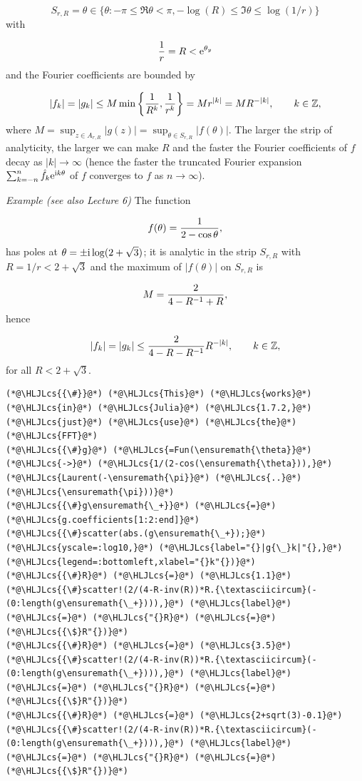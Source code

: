 \documentclass[12pt,a4paper]{article}
\newcommand{\HLJLcs}[1]{\textcolor[RGB]{153,153,119}{\textit{#1}}}
\begin{document}
\[
S_{r,R} = \theta \in    \lbrace \theta : -\pi \leq \Re  \theta < \pi,  -\log(R) \leq \Im \theta \leq \log(1/r) \rbrace
\]
with

\[
{1 \over r} = R < {\rm e}^{\theta_y}
\]
and the Fourier coefficients are bounded by

\[
|f_k | = |g_k |  \leq M\min\left\{{1 \over R^k} , {1 \over r^k}\right\} = M r^{|k|} = M R^{-|k|}, \qquad k \in \mathbb{Z},
\]
where $M = \sup_{z \in  A_{r,R}} |g(z)| = \sup_{\theta \in  S_{r,R}} |f(\theta)|$. The larger the strip of analyticity, the larger we can make $R$ and the faster the Fourier coefficients of $f$ decay as $\vert k \vert \to \infty$ (hence the faster the truncated Fourier expansion $\sum_{k=-n}^{n}\hat f_k {\rm e}^{{\rm i} k \theta}$ of $f$ converges to $f$ as $n \to \infty$).

\emph{Example (see also Lecture 6)} The function

\[
 f(\theta) = {1 \over 2 - \cos\theta},
\]
has poles at $\theta = \pm {\rm i} \log (2 + \sqrt{3})$; it is analytic in the strip $S_{r,R}$ with $R = 1/r < 2 + \sqrt{3}$ and the maximum of $\vert f(\theta) \vert$ on $S_{r,R}$ is

\[
M = {2 \over 4 - R^{-1} + R},
\]
hence

\[
|f_k| =     |g_k| \leq {2 \over 4 - R -R^{-1}} R^{-\vert k \vert}, \qquad k \in \mathbb{Z},
\]
for all $R < 2 + \sqrt{3}$.


\begin{lstlisting}
(*@\HLJLcs{{\#}}@*) (*@\HLJLcs{This}@*) (*@\HLJLcs{works}@*) (*@\HLJLcs{in}@*) (*@\HLJLcs{Julia}@*) (*@\HLJLcs{1.7.2,}@*) (*@\HLJLcs{just}@*) (*@\HLJLcs{use}@*) (*@\HLJLcs{the}@*) (*@\HLJLcs{FFT}@*)
(*@\HLJLcs{{\#}g}@*) (*@\HLJLcs{=Fun(\ensuremath{\theta}}@*) (*@\HLJLcs{->}@*) (*@\HLJLcs{1/(2-cos(\ensuremath{\theta})),}@*) (*@\HLJLcs{Laurent(-\ensuremath{\pi}}@*) (*@\HLJLcs{..}@*) (*@\HLJLcs{\ensuremath{\pi}))}@*)
(*@\HLJLcs{{\#}g\ensuremath{\_+}}@*) (*@\HLJLcs{=}@*) (*@\HLJLcs{g.coefficients[1:2:end]}@*)
(*@\HLJLcs{{\#}scatter(abs.(g\ensuremath{\_+});}@*) (*@\HLJLcs{yscale=:log10,}@*) (*@\HLJLcs{label="{}|g{\_}k|"{},}@*) (*@\HLJLcs{legend=:bottomleft,xlabel="{}k"{})}@*)
(*@\HLJLcs{{\#}R}@*) (*@\HLJLcs{=}@*) (*@\HLJLcs{1.1}@*)
(*@\HLJLcs{{\#}scatter!(2/(4-R-inv(R))*R.{\textasciicircum}(-(0:length(g\ensuremath{\_+}))),}@*) (*@\HLJLcs{label}@*) (*@\HLJLcs{=}@*) (*@\HLJLcs{"{}R}@*) (*@\HLJLcs{=}@*) (*@\HLJLcs{{\$}R"{})}@*)
(*@\HLJLcs{{\#}R}@*) (*@\HLJLcs{=}@*) (*@\HLJLcs{3.5}@*)
(*@\HLJLcs{{\#}scatter!(2/(4-R-inv(R))*R.{\textasciicircum}(-(0:length(g\ensuremath{\_+}))),}@*) (*@\HLJLcs{label}@*) (*@\HLJLcs{=}@*) (*@\HLJLcs{"{}R}@*) (*@\HLJLcs{=}@*) (*@\HLJLcs{{\$}R"{})}@*)
(*@\HLJLcs{{\#}R}@*) (*@\HLJLcs{=}@*) (*@\HLJLcs{2+sqrt(3)-0.1}@*)
(*@\HLJLcs{{\#}scatter!(2/(4-R-inv(R))*R.{\textasciicircum}(-(0:length(g\ensuremath{\_+}))),}@*) (*@\HLJLcs{label}@*) (*@\HLJLcs{=}@*) (*@\HLJLcs{"{}R}@*) (*@\HLJLcs{=}@*) (*@\HLJLcs{{\$}R"{})}@*)
\end{lstlisting}
\end{document}
